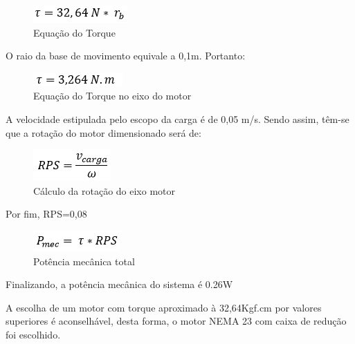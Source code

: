 \begin{figure}[!h]
\centering
\includegraphics[scale=0.8, angle = 360]{figuras/formula3}
\caption[]{Equação do Torque}
\label{Equação do Torque}
\end{figure}
\FloatBarrier

O raio da base de movimento equivale a 0,1m. Portanto:

\begin{figure}[!h]
\centering
\includegraphics[scale=0.8, angle = 360]{figuras/formula4}
\caption[]{Equação do Torque no eixo do motor}
\label{Equação do Torque no eixo do motor}
\end{figure}
\FloatBarrier

A velocidade estipulada pelo escopo da carga é de 0,05 m/s. Sendo assim, têm-se que a rotação do motor dimensionado será de:
 
\begin{figure}[!h]
\centering
\includegraphics[scale=0.8, angle = 360]{figuras/formula5}
\caption[]{Cálculo da rotação do eixo motor}
\label{Cálculo da rotação do eixo motor}
\end{figure}
\FloatBarrier

Por fim, RPS=0,08


\begin{figure}[!h]
\centering
\includegraphics[scale=0.8, angle = 360]{figuras/formula7}
\caption[]{Potência mecânica total}
\label{Potência mecânica total}
\end{figure}
\FloatBarrier

Finalizando, a potência mecânica do sistema é 0.26W

A escolha de um motor com torque aproximado à 
32,64Kgf.cm por valores superiores é aconselhável, desta forma, o motor NEMA 23 com caixa de redução foi escolhido.

